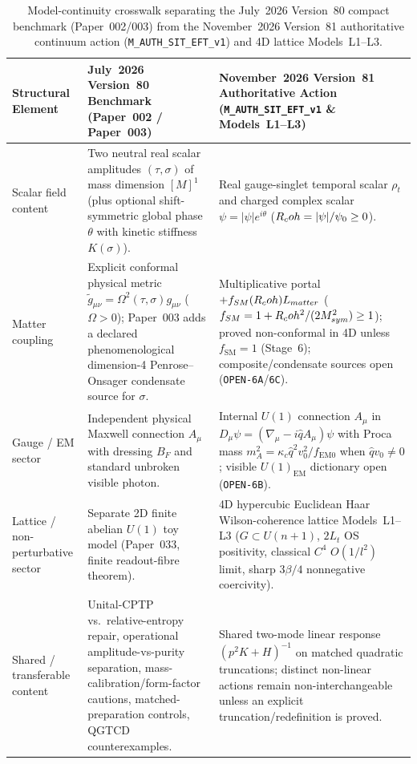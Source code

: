 \begin{table}[htbp]
\centering
\caption{Model-continuity crosswalk separating the July~2026 Version~80 compact benchmark (Paper~002/003) from the November~2026 Version~81 authoritative continuum action (\texttt{M\_AUTH\_SIT\_EFT\_v1}) and 4D lattice Models~L1--L3.}
\label{tab:july-v80-vs-nov-v81}
\vspace{0.35em}
\footnotesize
\begin{tabular}{|p{2.7cm}|p{5.8cm}|p{6.2cm}|}
\hline
\textbf{Structural Element} & \textbf{July~2026 Version~80 Benchmark (Paper~002 / Paper~003)} & \textbf{November~2026 Version~81 Authoritative Action (\texttt{M\_AUTH\_SIT\_EFT\_v1} \& Models~L1--L3)} \\
\hline
Scalar field content & Two neutral real scalar amplitudes $(\tau, \sigma)$ of mass dimension $[M]^1$ (plus optional shift-symmetric global phase $\theta$ with kinetic stiffness $K(\sigma)$). & Real gauge-singlet temporal scalar $\rho_t$ and charged complex scalar $\psi = |\psi|e^{i\theta}$ ($R_coh = |\psi|/\psi_0 \ge 0$). \\
\hline
Matter coupling & Explicit conformal physical metric $\tilde{g}_{\mu\nu} = \Omega^2(\tau,\sigma)g_{\mu\nu}$ ($\Omega > 0$); Paper~003 adds a declared phenomenological dimension-4 Penrose--Onsager condensate source for $\sigma$. & Multiplicative portal $+f_{SM}(R_coh)L_{matter}$ ($f_{SM} = 1 + R_coh^2/(2M_{sym}^2) \ge 1$); proved non-conformal in 4D unless $f_{\mathrm{SM}} = 1$ (Stage~6); composite/condensate sources open (\texttt{OPEN-6A}/\texttt{6C}). \\
\hline
Gauge / EM sector & Independent physical Maxwell connection $A_\mu$ with dressing $B_F$ and standard unbroken visible photon. & Internal $U(1)$ connection $A_\mu$ in $D_\mu\psi = (\nabla_\mu - i\hat{q}A_\mu)\psi$ with Proca mass $m_A^2 = \kappa_c\hat{q}^2 v_0^2/f_{\mathrm{EM}0}$ when $\hat{q}v_0 \ne 0$; visible $U(1)_{\mathrm{EM}}$ dictionary open (\texttt{OPEN-6B}). \\
\hline
Lattice / non-perturbative sector & Separate 2D finite abelian $U(1)$ toy model (Paper~033, finite readout-fibre theorem). & 4D hypercubic Euclidean Haar Wilson-coherence lattice Models~L1--L3 ($G \subset U(n+1)$, $2L_t$ OS positivity, classical $C^4$ $O(1/l^2)$ limit, sharp $3\beta/4$ nonnegative coercivity). \\
\hline
Shared / transferable content & Unital-CPTP vs.\ relative-entropy repair, operational amplitude-vs-purity separation, mass-calibration/form-factor cautions, matched-preparation controls, QGTCD counterexamples. & Shared two-mode linear response $(p^2 K + H)^{-1}$ on matched quadratic truncations; distinct non-linear actions remain non-interchangeable unless an explicit truncation/redefinition is proved. \\
\hline
\end{tabular}
\end{table}

